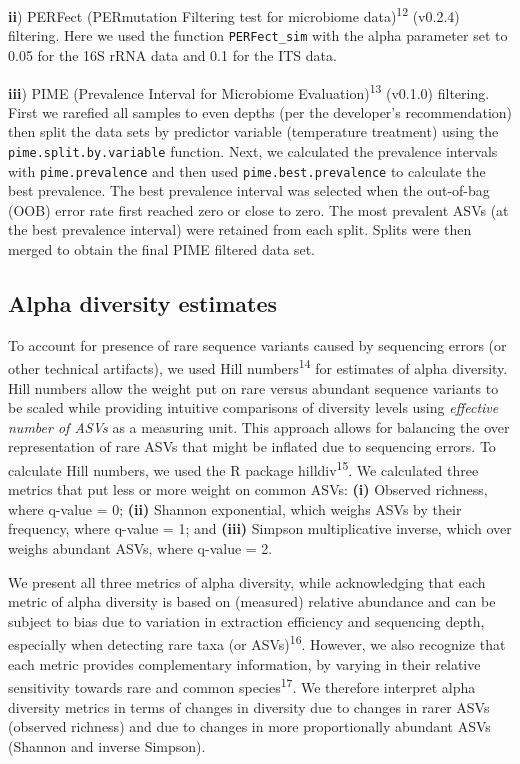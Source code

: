 \documentclass[
  10pt,
  letterpaper,
  DIV=11,
  numbers=noendperiod]{scrartcl}
\begin{document}
\textbf{ii}) PERFect (PERmutation Filtering test for microbiome
data)\textsuperscript{12} (v0.2.4) filtering. Here we used the function
\texttt{PERFect\_sim} with the alpha parameter set to 0.05 for the 16S
rRNA data and 0.1 for the ITS data.

\textbf{iii}) PIME (Prevalence Interval for Microbiome
Evaluation)\textsuperscript{13} (v0.1.0) filtering. First we rarefied
all samples to even depths (per the developer's recommendation) then
split the data sets by predictor variable (temperature treatment) using
the \texttt{pime.split.by.variable} function. Next, we calculated the
prevalence intervals with \texttt{pime.prevalence} and then used
\texttt{pime.best.prevalence} to calculate the best prevalence. The best
prevalence interval was selected when the out-of-bag (OOB) error rate
first reached zero or close to zero. The most prevalent ASVs (at the
best prevalence interval) were retained from each split. Splits were
then merged to obtain the final PIME filtered data set.

\hypertarget{alpha-diversity-estimates}{%
\subsection{Alpha diversity estimates}\label{alpha-diversity-estimates}}

To account for presence of rare sequence variants caused by sequencing
errors (or other technical artifacts), we used Hill
numbers\textsuperscript{14} for estimates of alpha diversity. Hill
numbers allow the weight put on rare versus abundant sequence variants
to be scaled while providing intuitive comparisons of diversity levels
using \emph{effective number of ASVs} as a measuring unit. This approach
allows for balancing the over representation of rare ASVs that might be
inflated due to sequencing errors. To calculate Hill numbers, we used
the R package hilldiv\textsuperscript{15}. We calculated three metrics
that put less or more weight on common ASVs: \textbf{(i)} Observed
richness, where q-value = 0; \textbf{(ii)} Shannon exponential, which
weighs ASVs by their frequency, where q-value = 1; and \textbf{(iii)}
Simpson multiplicative inverse, which over weighs abundant ASVs, where
q-value = 2.

We present all three metrics of alpha diversity, while acknowledging
that each metric of alpha diversity is based on (measured) relative
abundance and can be subject to bias due to variation in extraction
efficiency and sequencing depth, especially when detecting rare taxa (or
ASVs)\textsuperscript{16}. However, we also recognize that each metric
provides complementary information, by varying in their relative
sensitivity towards rare and common species\textsuperscript{17}. We
therefore interpret alpha diversity metrics in terms of changes in
diversity due to changes in rarer ASVs (observed richness) and due to
changes in more proportionally abundant ASVs (Shannon and inverse
Simpson).
\end{document}
